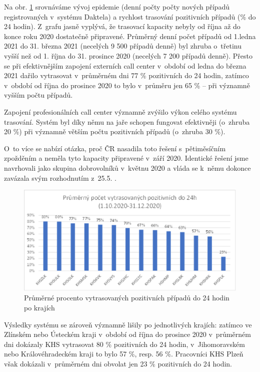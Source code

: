 Na obr. \ref{fig:pozitivni24_3} srovnáváme vývoj epidemie (denní počty počty nových případů registrovaných v~systému Daktela) a rychlost trasování pozitivních případů (\% do 24 hodin). Z~grafu jasně vyplývá, že trasovací kapacity nebyly od října až do konce roku 2020 dostatečně připravené. Průměrný denní počet případů od 1.ledna 2021 do 31. března 2021 (necelých 9 500 případů denně) byl zhruba o~třetinu vyšší než od 1. října do 31. prosince 2020 (necelých 7 200 případů denně). Přesto se při efektivnějším zapojení externích call center v~období od ledna do března 2021 dařilo vytrasovat v~průměrném dni 77 \% pozitivních do 24 hodin, zatímco v~období od října do prosince 2020 to bylo v~průměru jen 65 \% -- při významně vyšším počtu případů.

Zapojení profesionálních call center významně zvýšilo výkon celého systému trasování. Systém byl díky němu na jaře schopen fungovat efektivněji (o~zhruba 20 \%) při významně větším počtu pozitivních případů (o~zhruba 30 \%).

O~to více se nabízí otázka, proč ČR nasadila toto řešení s~pětiměsíčním zpožděním a neměla tyto kapacity připravené v~září 2020. Identické řešení jsme navrhovali jako skupina dobrovolníků v~květnu 2020 \cite{tr_hlidac02} a vláda se k~němu dokonce zavázala svým rozhodnutím z~25.5. \cite{tr_vlada01}.

\begin{figure}[ht]
    \centering
    \includegraphics[width=1\textwidth]{./pic/c.eps}
    \caption{Průměrné procento vytrasovaných pozitivních případů do 24 hodin po krajích}
    \label{fig:pozitivni24_3}
\end{figure}

Výsledky systému se zároveň významně lišily po jednotlivých krajích: zatímco ve Zlínském nebo Ústeckém kraji v~období od října do prosince 2020 v~průměrném dni dokázaly KHS vytrasovat 80 \% pozitivních do 24 hodin, v~Jihomoravském nebo Královéhradeckém kraji to bylo 57 \%, resp. 56 \%. Pracovníci KHS Plzeň však dokázali v~průměrném dni obvolat jen 23 \% pozitivních do 24 hodin.

